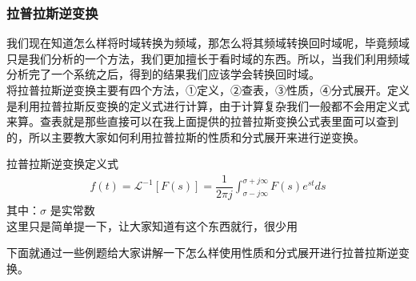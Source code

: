 \documentclass[UTF8,a4paper,12pt]{ctexart}
\begin{document}
   \subsubsection{拉普拉斯逆变换} 
    \begin{flushleft}
      我们现在知道怎么样将时域转换为频域，那怎么将其频域转换回时域呢，毕竟频域只是我们分析的一个方法，我们更加擅长于看时域的东西。所以，当我们利用频域分析完了一个系统之后，得到的结果我们应该学会转换回时域。
      \\将拉普拉斯逆变换主要有四个方法，①定义，②查表，③性质，④分式展开。定义是利用拉普拉斯反变换的定义式进行计算，由于计算复杂我们一般都不会用定义式来算。查表就是那些直接可以在我上面提供的拉普拉斯变换公式表里面可以查到的，所以主要教大家如何利用拉普拉斯的性质和分式展开来进行逆变换。
    \end{flushleft}
    \begin{titlebox}{拉普拉斯逆变换定义式}
      \begin{align*}
        f(t)=\mathcal{L}^{-1}[F(s)]=\dfrac{1}{2\pi j}\int_{\sigma -j\infty}^{\sigma +j\infty}{F\left( s \right)}e^{st}ds
      \end{align*}    
      其中：$\sigma$ 是实常数
       \\这里只是简单提一下，让大家知道有这个东西就行，很少用
    \end{titlebox}
    下面就通过一些例题给大家讲解一下怎么样使用性质和分式展开进行拉普拉斯逆变换。
\end{document}
